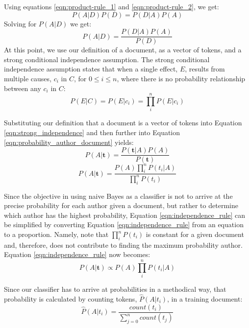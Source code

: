 		Using equations \ref{eqn:product-rule_1} and \ref{eqn:product-rule_2}, we get:
		\begin{equation} P(A|D) P(D) = P(D|A) P(A)\end{equation}
		Solving for $P(A|D)$ we get:
		\begin{equation} \label{eqn:probability_author_document} P(A|D) = \frac{P(D|A) P(A)}{P(D)} \end{equation}
		At this point, we use our definition of a document, as a vector of tokens, and a strong conditional independence assumption.  The strong conditional independence assumption states that when a single effect, $E$, results from multiple causes, $c_i$ in $C$, for $ 0 \le i \le n $, where there is no probability relationship between any $c_i$ in $C$: 
		\begin{equation} \label{eqn:strong_independence} P(E|C) = P(E|c_i) = \prod_i^n P(E|c_i) \end{equation}
		
		Substituting our definition that a document is a vector of tokens into Equation \ref{eqn:strong_independence} and then further into Equation \ref{eqn:probability_author_document} yields:
		\begin{equation} P(A|\mathbf{t}) = \frac{P(\mathbf{t}|A) P(A)}{P(\mathbf{t})} \end{equation}
		\begin{equation} \label{eqn:independence_rule} P(A|\mathbf{t}) = \frac{P(A) \prod_i^n P(t_i|A)}{\prod_i^n P(t_i)} \end{equation}
		
		Since the objective in using naive Bayes as a classifier is not to arrive at the precise probability for each author given a document, but rather to determine which author has the highest probability, Equation \ref{eqn:independence_rule} can be simplified by converting Equation \ref{eqn:independence_rule} from an equation to a proportion.  Namely, note that $\prod_i^n P(t_i) $ is constant for a given document and, therefore, does not contribute to finding the maximum probability author.  Equation \ref{eqn:independence_rule} now becomes:
		\begin{equation} P(A|\mathbf{t}) \propto P(A) \prod_i^n P(t_i|A) \end{equation}
		
		Since our classifier has to arrive at probabilities in a methodical way, that probability is calculated by counting tokens, $\hat{P}(A|t_i)$, in a training document:
		\begin{equation} \hat{P}(A|t_i) = \frac{count(t_i)}{\sum_{j=0}^n count(t_j)} \end{equation}
		
